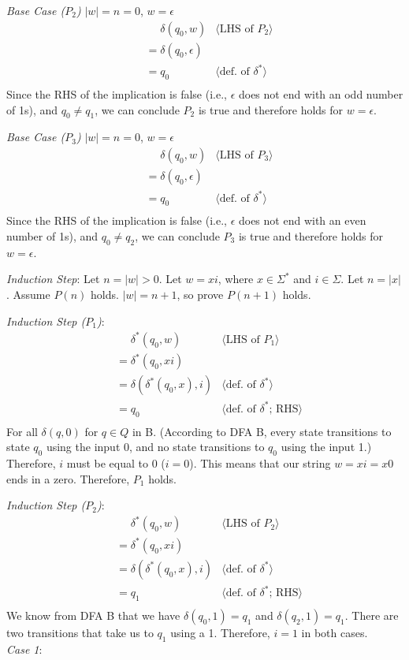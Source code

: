 \documentclass[11pt,fleqn]{article}
\newcommand{\pnote}[1]{\langle \mbox{#1} \rangle}
\begin{document}
    \emph{Base Case ($P_2$)} $|w| = n = 0$, $w = \epsilon$
    \begin{align*}
      &\phantom{{}=} \delta(q_0, w) & \pnote{LHS of $P_2$}\\
      &= \delta(q_0, \epsilon) \\
      &= q_0       & \pnote{def. of $\delta^*$}\\
    \end{align*}
    Since the RHS of the implication is false (i.e., $\epsilon$ does not end with an odd number of 1s), and $q_0 \neq q_1$, we can conclude $P_2$ is true and therefore holds for $w = \epsilon$.

    \emph{Base Case ($P_3$)} $|w| = n = 0$, $w = \epsilon$
    \begin{align*}
      &\phantom{{}=} \delta(q_0, w) & \pnote{LHS of $P_3$}\\
      &= \delta(q_0, \epsilon) \\
      &= q_0       & \pnote{def. of $\delta^*$}\\
    \end{align*}
    Since the RHS of the implication is false (i.e., $\epsilon$ does not end with an even number of 1s), and $q_0 \neq q_2$, we can conclude $P_3$ is true and therefore holds for $w = \epsilon$.

    \emph{Induction Step}: Let $n = |w| > 0$. Let $w = xi$, where $x \in \Sigma^*$ and $i \in \Sigma$. Let $n = |x|$. Assume $P(n)$ holds. $|w| = n+1$, so prove $P(n+1)$ holds.

    \emph{Induction Step ($P_1$)}:
    \begin{align*}
      &\phantom{{}=} \delta^*(q_0, w) & \pnote{LHS of $P_1$}\\
      &= \delta^*(q_0, xi) \\
      &= \delta(\delta^*(q_0, x), i)      & \pnote{def. of $\delta^*$}\\
      &= q_0       & \pnote{def. of $\delta^*$; RHS}\\
    \end{align*}
    For all $\delta(q, 0)$ for $q \in Q$ in B. (According to DFA B, every state transitions to state $q_0$ using the input 0, and no state transitions to $q_0$ using the input 1.) Therefore, $i$ must be equal to 0 ($i=0$). This means that our string $w = xi = x0$ ends in a zero. Therefore, $P_1$ holds.

    \emph{Induction Step ($P_2$)}:
    \begin{align*}
      &\phantom{{}=} \delta^*(q_0, w) & \pnote{LHS of $P_2$}\\
      &= \delta^*(q_0, xi) \\
      &= \delta(\delta^*(q_0, x), i)      & \pnote{def. of $\delta^*$}\\
      &= q_1       & \pnote{def. of $\delta^*$; RHS}\\
    \end{align*}
    We know from DFA B that we have $\delta(q_0, 1) = q_1$ and $\delta(q_2, 1) = q_1$. There are two transitions that take us to $q_1$ using a 1. Therefore, $i = 1$ in both cases.\\
    \emph{Case 1}: 
     
\end{document}
